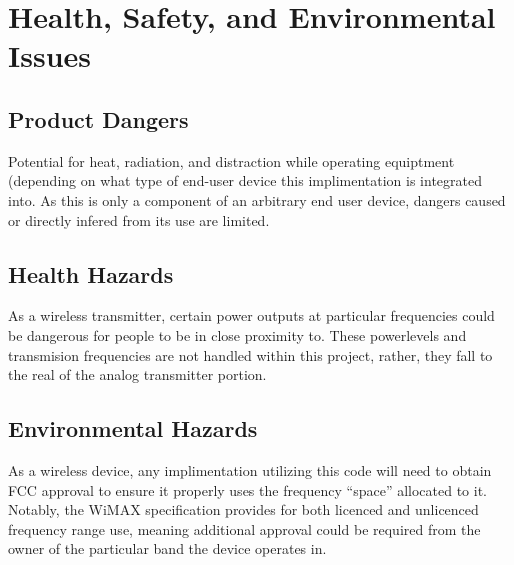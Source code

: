 \section{Health, Safety, and Environmental Issues}

\subsection{Product Dangers}

Potential for heat, radiation, and distraction while operating equiptment (depending on what type of end-user device this implimentation is integrated into. As this is only a component of an arbitrary end user device, dangers caused or directly infered from its use are limited.

\subsection{Health Hazards}

As a wireless transmitter, certain power outputs at particular frequencies could be dangerous for people to be in close proximity to. These powerlevels and transmision frequencies are not handled within this project, rather, they fall to the real of the analog transmitter portion.

\subsection{Environmental Hazards}

As a wireless device, any implimentation utilizing this code will need to obtain FCC approval to ensure it properly uses the frequency ``space'' allocated to it. Notably, the WiMAX specification provides for both licenced and unlicenced frequency range use, meaning additional approval could be required from the owner of the particular band the device operates in.